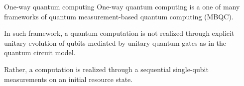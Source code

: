 \documentclass[final]{beamer}
\newlength{\sepwidth}
\newlength{\colwidth}
\newcommand{\separatorcolumn}{\begin{column}{\sepwidth}\end{column}}
\begin{document}
    \begin{frame}[t]
        \begin{columns}[t]
            \separatorcolumn

            \begin{column}{\colwidth}
                \begin{block}{One-way quantum computing}
                    One-way quantum computing is a one of many frameworks of quantum
                    measurement-based quantum computing (MBQC).

                    In such framework, a quantum computation is not realized through explicit
                    unitary evolution of qubits mediated by unitary quantum gates as in the
                    quantum circuit model.

                    Rather, a computation is realized through a sequential single-qubit
                    measurements on an initial resource state.

                    \begin{figure}[H]
                        \centering
\end{figure}
\end{block}
\end{column}
\end{columns}
\end{frame}
\end{document}
